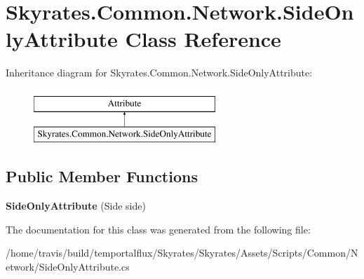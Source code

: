 \hypertarget{class_skyrates_1_1_common_1_1_network_1_1_side_only_attribute}{\section{Skyrates.\-Common.\-Network.\-Side\-Only\-Attribute Class Reference}
\label{class_skyrates_1_1_common_1_1_network_1_1_side_only_attribute}
}
Inheritance diagram for Skyrates.\-Common.\-Network.\-Side\-Only\-Attribute\-:\begin{figure}[H]
\begin{center}
\leavevmode
\includegraphics[height=2.000000cm]{class_skyrates_1_1_common_1_1_network_1_1_side_only_attribute}
\end{center}
\end{figure}
\subsection*{Public Member Functions}
\begin{DoxyCompactItemize}
\item 
\hypertarget{class_skyrates_1_1_common_1_1_network_1_1_side_only_attribute_a1182d8df33ae3ef04f88883abefdd599}{{\bfseries Side\-Only\-Attribute} (Side side)}\label{class_skyrates_1_1_common_1_1_network_1_1_side_only_attribute_a1182d8df33ae3ef04f88883abefdd599}

\end{DoxyCompactItemize}


The documentation for this class was generated from the following file\-:\begin{DoxyCompactItemize}
\item 
/home/travis/build/temportalflux/\-Skyrates/\-Skyrates/\-Assets/\-Scripts/\-Common/\-Network/Side\-Only\-Attribute.\-cs\end{DoxyCompactItemize}
